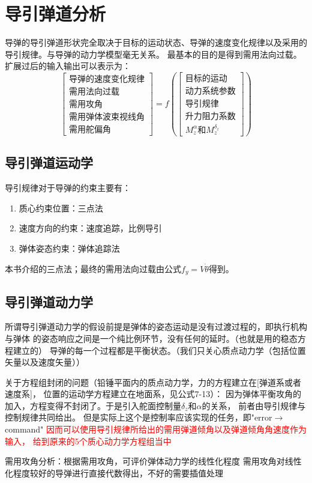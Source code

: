\chapter{导引弹道分析}
导弹的导引弹道形状完全取决于目标的运动状态、导弹的速度变化规律以及采用的导引规律。与导弹的动力学模型毫无关系。
最基本的目的是得到需用法向过载。
扩展过后的输入输出可以表示为：
$$
\left[
    \begin{matrix}
        \mbox{导弹的速度变化规律}\\
        \mbox{需用法向过载}\\
        \mbox{需用攻角}\\
        \mbox{需用弹体波束视线角}\\
        \mbox{需用舵偏角}
    \end{matrix}
    \right]
    =
    f\left(
        \left[
            \begin{matrix}
                \mbox{目标的运动}\\
                \mbox{动力系统参数}\\
                \mbox{导引规律}\\
                \mbox{升力阻力系数}\\
                \mbox{$M_z^{\alpha}$和$M_z^{\delta_z}$}
            \end{matrix}
            \right]
        \right)
$$
\section{导引弹道运动学}
导引规律对于导弹的约束主要有：
\begin{enumerate}
    \item 质心约束位置：三点法
    \item 速度方向的约束：速度追踪，比例导引
    \item 弹体姿态约束：弹体追踪法
\end{enumerate}
本书介绍的三点法；最终的需用法向过载由公式$f_y = V\dot{\theta}$得到。
\section{导引弹道动力学}
所谓导引弹道动力学的假设前提是弹体的姿态运动是没有过渡过程的，即执行机构与弹体
的姿态响应之间是一个纯比例环节，没有任何的延时。（也就是用的稳态方程建立的）
导弹的每一个过程都是平衡状态。（我们只关心质点动力学（包括位置矢量以及速度矢量））

{\kaishu 
关于方程组封闭的问题（铅锤平面内的质点动力学，力的方程建立在[弹道系或者速度系]，
位置的运动学方程建立在地面系，见公式7-13）：
因为弹体平衡攻角的加入，方程变得不封闭了。于是引入舵面控制量$\delta_z$和$\alpha$的关系，
前者由导引规律与控制规律共同给出。
但是实际上这个是控制率应该实现的任务，即"error$\rightarrow$command"
{\textcolor{red}{因而可以使用导引规律所给出的需用弹道倾角以及弹道倾角角速度作为输入，
给到原来的5个质心动力学方程组当中}}
}

需用攻角分析：根据需用攻角，可评价弹体动力学的线性化程度
需用攻角对线性化程度较好的导弹进行直接代数得出，不好的需要插值处理